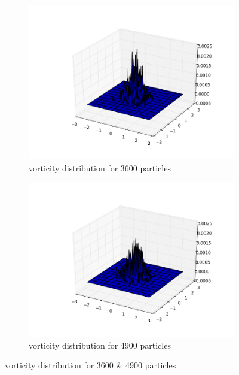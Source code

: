 \documentclass[a4paper,11pt]{article}
\begin{document}
\begin{figure}[h]
	\centering
	\begin{subfigure}[h]{.5\textwidth}
  		\centering
  		\includegraphics[width=.8\linewidth]{vorticity_distribution_for_3600_particles.png}
  		\caption{vorticity distribution for 3600 particles}
  		\label{fig:36}
	\end{subfigure}
	\begin{subfigure}[h]{.5\textwidth}
  		\centering
  		\includegraphics[width=.8\linewidth]{vorticity_distribution_for_4900_particles.png}
  		\caption{vorticity distribution for 4900 particles}
  		\label{fig:49}
	\end{subfigure}%
	\label{fig:Question 1a}
  \caption{vorticity distribution for 3600 \& 4900 particles}
\end{figure}
\end{document}
